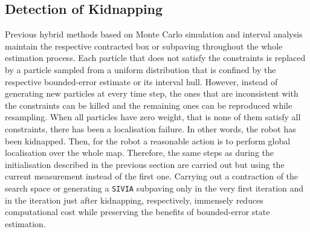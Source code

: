 \subsection{Detection of Kidnapping}

Previous hybrid methods based on Monte Carlo simulation and interval analysis maintain the respective contracted box \cite{neulandh_ybridazation} or subpaving \cite{neuland_set_inversion} throughout the whole estimation process. Each particle that does not satisfy the constraints is replaced by a particle sampled from a uniform distribution that is confined by the respective bounded-error estimate or its interval hull. However, instead of generating new particles at every time step, the ones that are inconsistent with the constraints can be killed and the remaining ones can be reproduced while resampling. When all particles have zero weight, that is none of them satisfy all constraints, there has been a localisation failure. In other words, the robot has been kidnapped. Then, for the robot a reasonable action is to perform global localisation over the whole map. Therefore, the same steps as during the initialisation described in the previous section are carried out but using the current measurement instead of the first one. Carrying out a contraction of the search space or generating a \texttt{SIVIA} subpaving only in the very first iteration and in the iteration just after kidnapping, respectively, immensely reduces computational cost while preserving the benefits of bounded-error state estimation.


